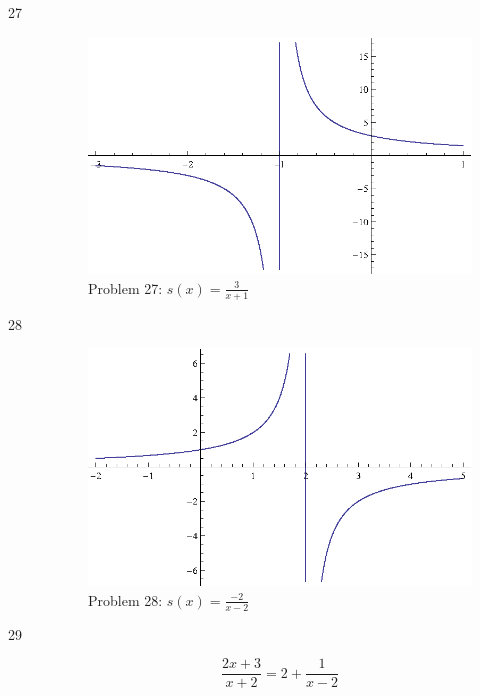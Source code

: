 \documentclass{exam}
\begin{document}
\begin{description}
    \item[27] 
      \begin{figure}[H]
        \centering
        \includegraphics{problem27.eps}
        \caption*{Problem 27: $s(x) = \frac{3}{x + 1}$}
      \end{figure}

    \item[28] 
      \begin{figure}[H]
        \centering
        \includegraphics{problem28.eps}
        \caption*{Problem 28: $s(x) = \frac{-2}{x - 2}$}
      \end{figure}

    \item[29] 
      \[ \frac{2x + 3}{x + 2} = 2 + \frac{1}{x - 2} \]


\end{description}
\end{document}
